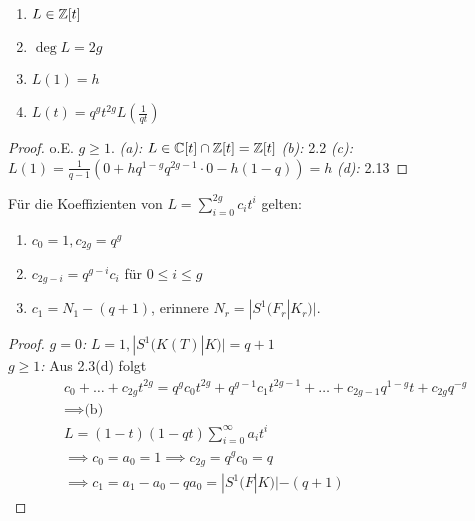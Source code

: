 \begin{lemma}
    \begin{enumerate}[label=(\alph*)]
        \item $L \in \mathbb{Z}[t]$
        \item $\deg L = 2g$
        \item $L(1) = h$
        \item $L(t) = q^gt^{2g}L\left(\frac{1}{qt}\right)$
    \end{enumerate}
\end{lemma}
\begin{proof}
    o.E. $g\geq 1$.
    \emph{(a):} $L \in \mathbb{C}[t] \cap \mathbb{Z}[t] = \mathbb{Z}[t]$\nl
    \emph{(b):} 2.2\nl
    \emph{(c):} $L(1) = \frac{1}{q-1} \left(0 + hq^{1-g}q^{2g-1}\cdot 0 - h(1-q)\right) = h$\nl
    \emph{(d):} 2.13
\end{proof}

\begin{satz}
    Für die Koeffizienten von $ L = \sum\limits_{i=0}^{2g} c_it^i$ gelten:
    \begin{enumerate}[label=(\alph*)]
        \item $c_0=1, c_{2g}=q^g$
        \item $c_{2g-i} = q^{g-i}c_i$ für $0 \leq i \leq g$
        \item $c_1 = N_1 - (q + 1)$, erinnere $ N_r = |S^1(F_r|K_r)|.$
    \end{enumerate}
\end{satz}
\begin{proof}
    \emph{$g=0$:} $L=1, |S^1(K(T)|K)|=q+1$\\
    \emph{$g \geq 1$:} Aus 2.3(d) folgt
    \begin{align*}
        &c_0 + \ldots + c_{2g}t^{2g} = q^g c_0 t^{2g} + q^{g-1} c_1 t^{2g-1} + \ldots + c_{2g-1} q^{1-g}t + c_{2g} q^{-g}\\
        &\implies \text{(b)}\\
        & L = (1-t)(1-qt)\sum_{i=0}^\infty a_i t^i\\
        & \implies c_0 = a_0 = 1 \implies c_{2g} = q^g c_0 = q\\
        & \implies c_1 = a_1 - a_0 - qa_0 = |S^1(F|K)| - (q+1)
    \end{align*}
\end{proof}

